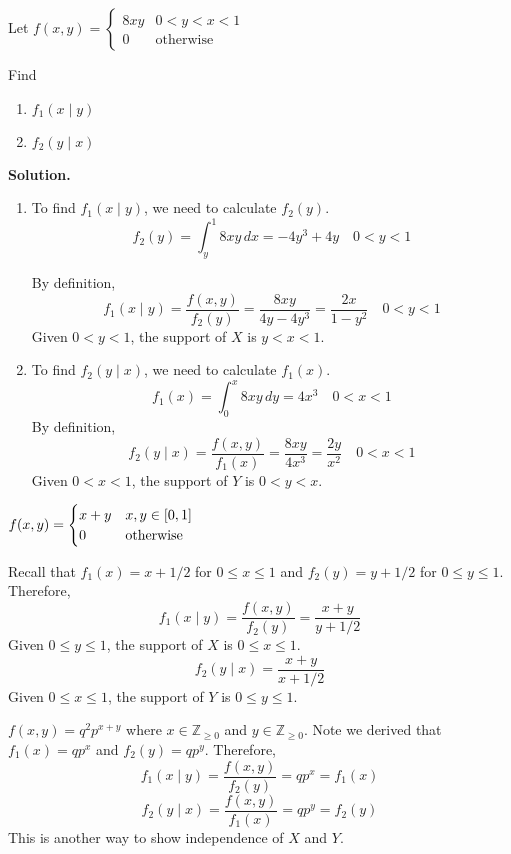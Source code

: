 \begin{Example}{}{}
    Let $ \displaystyle f(x,y)=\begin{cases}
            8 x y & 0<y<x<1          \\
            0     & \text{otherwise}
        \end{cases}  $

    Find
    \begin{enumerate}[label=(\roman*)]
        \item $ f_1(x\mid y) $
        \item $ f_2(y\mid x) $
    \end{enumerate}
    \textbf{Solution.}
    \begin{enumerate}[label=(\roman*)]
        \item To find $ f_1(x\mid y) $, we need to calculate
              $ f_2(y) $.
              \[ f_2(y)=\int_{y}^{1} 8xy\, d{x}=-4y^3+4y \quad 0<y<1 \]

              By definition,
              \[ f_1(x\mid y)=\frac{f(x,y)}{f_2(y)}=
                  \frac{8xy}{4y-4y^3}=\frac{2x}{1-y^2} \quad 0<y<1 \]
              Given $ 0<y<1 $, the support
              of $ X $ is $ y<x<1 $.
        \item To find $ f_2(y\mid x) $, we need to calculate $ f_1(x) $.
              \[ f_1(x)=\int_{0}^{x} 8xy\, d{y}=4x^3\quad 0<x<1 \]
              By definition,
              \[ f_2(y\mid x)=\frac{f(x,y)}{f_1(x)} =\frac{8xy}{4x^3} =\frac{2y}{x^2} \quad 0<x<1 \]
              Given $ 0<x<1 $, the support of $ Y $ is $ 0<y<x $.
    \end{enumerate}
\end{Example}
\begin{Example}{}{}
    $ \displaystyle f(x,y)=\begin{cases}
            x+y & x,y\in\interval{0}{1} \\
            0   & \text{otherwise}
        \end{cases} $

    Recall that $ f_1(x)=x+1/2 $ for $ 0\leqslant x\leqslant 1 $ and
    $ f_2(y)=y+1/2 $ for $ 0\leqslant y\leqslant 1 $. Therefore,
    \[ f_1(x\mid y)=\frac{f(x,y)}{f_2(y)} =\frac{x+y}{y+1/2} \]
    Given $ 0\leqslant y\leqslant 1 $, the support of $ X $ is $ 0\leqslant x\leqslant 1 $.
    \[ f_2(y\mid x)=\frac{x+y}{x+1/2} \]
    Given $ 0\leqslant x\leqslant 1 $, the support of $ Y $ is $ 0\leqslant y\leqslant 1 $.
\end{Example}
\begin{Example}{}{}
    $ f(x,y)=q^2p^{x+y} $ where $ x\in\mathbb{Z}_{\geqslant 0} $
    and $ y\in\mathbb{Z}_{\geqslant 0} $. Note we derived
    that $ f_1(x)=qp^x $ and $ f_2(y)=qp^y $. Therefore,
    \[ f_1(x\mid y)=\frac{f(x,y)}{f_2(y)} =qp^x=f_1(x) \]
    \[ f_2(y\mid x)=\frac{f(x,y)}{f_1(x)}=qp^y=f_2(y) \]
    This is another way to show independence of $ X $ and $ Y $.
\end{Example}
